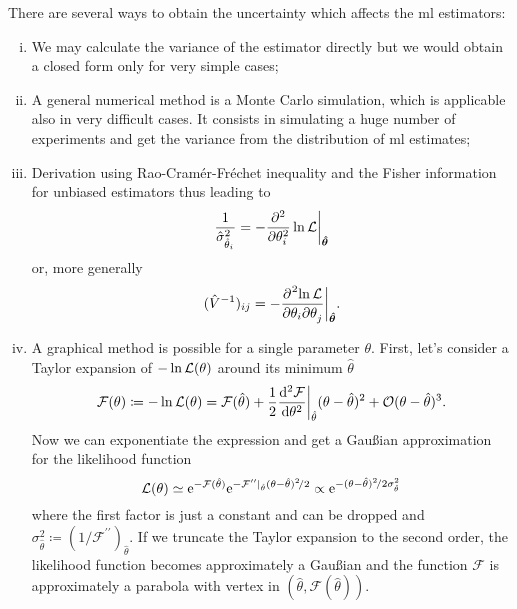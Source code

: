 There are several ways to obtain the uncertainty which affects the \ac{ml} estimators:
\begin{enumerate}[i.]
	\item
		We may calculate the variance of the estimator directly but we would obtain a closed form only for very simple cases;
	\item
		A general numerical method is a Monte Carlo simulation, which is applicable also in very difficult cases.
		It consists in simulating a huge number of experiments and get the variance from the distribution of \ac{ml} estimates;
	\item
		Derivation using Rao-Cramér-Fréchet inequality and the Fisher information for unbiased estimators \vec{\hat\theta} thus leading to
		\begin{equation}
			\frac{1}{\hat{\sigma}^2_{\hat{\theta}_i}} = -\pderiv[2]{}{\theta_i}\ln\lkhd\bigg\rvert_{\vec{\hat\theta}}
		\end{equation}
		or, more generally
		\begin{equation}
			(\hat V^{-1})_{ij} = - \pderiv{^2\!\ln\lkhd}{\theta_i\!\de\theta_j}\bigg\rvert_{\vec{\hat\theta}}.
		\end{equation}
	\item
		A graphical method is possible for a single parameter $\theta$.
		First, let's consider a Taylor expansion of $-\ln\lkhd(\theta)$ around its minimum $\hat\theta$
		\begin{equation}
			\mathcal{F}(\theta) \coloneqq -\ln \lkhd(\theta)
			= \mathcal{F}(\hat\theta) + \frac{1}{2}\deriv[2]{\mathcal{F}}{\theta}\bigg\rvert_{\hat\theta}(\theta-\hat\theta)^2 
			+ \mathcal{O}(\theta-\hat\theta)^3.
		\end{equation}
		Now we can exponentiate the expression and get a Gau\ss{}ian approximation for the likelihood function
		\begin{equation}\label{eq:GaussLikApprox}
			\lkhd(\theta) \simeq \eu^{-\mathcal{F}(\hat\theta)}\eu^{-\mathcal{F}^{\prime\prime}\mid_{\hat\theta} (\theta-\hat\theta)^2\!/2}
			\propto \eu^{-(\theta-\hat\theta)^2\!/2\sigma_{\hat\theta}^2}
		\end{equation}
		where the first factor is just a constant and can be dropped and $\sigma^2_{\hat\theta}\coloneqq (1/\mathcal{F}^{\prime\prime})_{\hat\theta}$.
		If we truncate the Taylor expansion to the second order, the likelihood function becomes approximately a Gau\ss{}ian and the function $\mathcal{F}$ is approximately a parabola with vertex in $(\hat\theta,\mathcal{F}(\hat\theta))$.



\end{enumerate}

